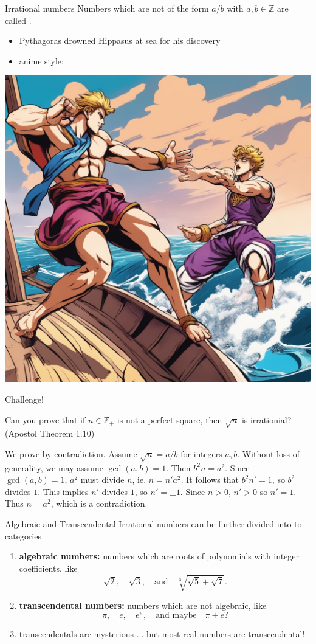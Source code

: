 \documentclass{beamer}
\begin{document}
\begin{frame}{Irrational numbers}
Numbers which are not of the form $a/b$ with $a,b\in\mathbb{Z}$ are called .\\
\begin{itemize}
\item Pythagoras drowned Hippasus at sea for his discovery
\item anime style:
\pause
\end{itemize}
\begin{center}
\includegraphics[width=0.4\linewidth]{fig/jojo-hippasus}
\end{center}
\end{frame}

\begin{frame}{Challenge!}
\begin{prob}
Can you prove that if $n\in\mathbb{Z}_+$ is not a perfect square, then $\sqrt{n}$ is irrationial?
(Apostol Theorem 1.10)
\end{prob}
\pause
\begin{soln}
We prove by contradiction. \pause
Assume $\sqrt{n} = a/b$ for integers $a,b$. \pause
Without loss of generality, we may assume $\gcd(a,b) = 1$. \pause
Then $b^2n = a^2$. \pause
Since $\gcd(a,b) = 1$, $a^2$ must divide $n$, ie. $n=n'a^2$. \pause
It follows that $b^2n' = 1$, so $b^2$ divides $1$. \pause
This implies $n'$ divides $1$, so $n'=\pm 1$. \pause
Since $n>0$, $n'>0$ so $n'=1$. \pause
Thus $n=a^2$, which is a contradiction.
\end{soln}
\end{frame}

\begin{frame}{Algebraic and Transcendental}
Irrational numbers can be further divided into to categories
\pause
\begin{enumerate}
\item \textbf{algebraic numbers:} numbers which are roots of polynomials with integer coefficients, like
$$\sqrt{2},\quad\sqrt{3},\quad\text{and}\quad\sqrt[3]{\sqrt{5}  + \sqrt{7}}.$$
\pause
\item \textbf{transcendental numbers:} numbers which are not algebraic, like
$$\pi,\quad e,\quad e^\pi,\quad\text{and maybe}\quad\pi+e?$$
\pause
\item transcendentals are mysterious ... but most real numbers are transcendental!
\end{enumerate}
\end{frame}
\end{document}
